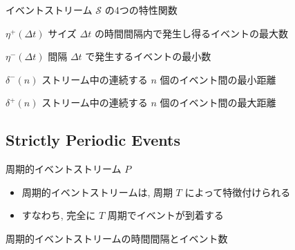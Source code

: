 \begin{frame}{イベントストリーム $\mathcal{S}$ の4つの特性関数}
    \begin{block}{$\eta^{+}(\Delta t)$}
        サイズ $\Delta t$ の時間間隔内で発生し得るイベントの最大数
    \end{block}
    \begin{block}{$\eta^{-}(\Delta t)$}
        間隔 $\Delta t$ で発生するイベントの最小数
    \end{block}
    \begin{block}{$\delta^{-}(n)$}
        ストリーム中の連続する $n$ 個のイベント間の最小距離
    \end{block}
    \begin{block}{$\delta^{+}(n)$}
        ストリーム中の連続する $n$ 個のイベント間の最大距離
    \end{block}
\end{frame}


\subsection{Strictly Periodic Events}
\label{ssec: strictly periodic events}

\begin{frame}{周期的イベントストリーム $P$}
    \begin{itemize}
        \item 周期的イベントストリームは, 周期 $T$ によって特徴付けられる
        \item すなわち, 完全に $T$ 周期でイベントが到着する
    \end{itemize}
\end{frame}

\begin{frame}{周期的イベントストリームの時間間隔とイベント数}
\end{frame}



